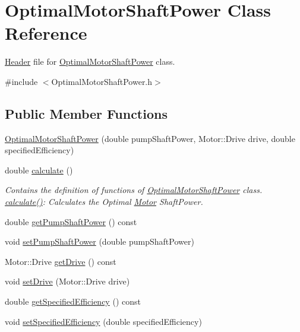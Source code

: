 \hypertarget{class_optimal_motor_shaft_power}{}\section{Optimal\+Motor\+Shaft\+Power Class Reference}
\label{class_optimal_motor_shaft_power}


\hyperlink{class_header}{Header} file for \hyperlink{class_optimal_motor_shaft_power}{Optimal\+Motor\+Shaft\+Power} class.  




{\ttfamily \#include $<$Optimal\+Motor\+Shaft\+Power.\+h$>$}

\subsection*{Public Member Functions}
\begin{DoxyCompactItemize}
\item 
\hyperlink{class_optimal_motor_shaft_power_ad830e1f8a7931e3c6bec5f8828d57e83}{Optimal\+Motor\+Shaft\+Power} (double pump\+Shaft\+Power, Motor\+::\+Drive drive, double specified\+Efficiency)
\item 
double \hyperlink{class_optimal_motor_shaft_power_a34d47733928ae518fa6f3d08b7d8a12e}{calculate} ()
\begin{DoxyCompactList}\small\item\em Contains the definition of functions of \hyperlink{class_optimal_motor_shaft_power}{Optimal\+Motor\+Shaft\+Power} class. \hyperlink{class_optimal_motor_shaft_power_a34d47733928ae518fa6f3d08b7d8a12e}{calculate()}\+: Calculates the Optimal \hyperlink{struct_motor}{Motor} Shaft\+Power. \end{DoxyCompactList}\item 
double \hyperlink{class_optimal_motor_shaft_power_aca7bb632c659ecf2ebf3cb9fdb23626f}{get\+Pump\+Shaft\+Power} () const
\item 
void \hyperlink{class_optimal_motor_shaft_power_ab2d80927fbaa62705359700b2a8f2f26}{set\+Pump\+Shaft\+Power} (double pump\+Shaft\+Power)
\item 
Motor\+::\+Drive \hyperlink{class_optimal_motor_shaft_power_a3cc369285d8b3582fcd8c44e5a1c37c8}{get\+Drive} () const
\item 
void \hyperlink{class_optimal_motor_shaft_power_a8f3288a69848c61f4e8e2b14da549d16}{set\+Drive} (Motor\+::\+Drive drive)
\item 
double \hyperlink{class_optimal_motor_shaft_power_a89c2038dae30ef58245e810187c2a6c4}{get\+Specified\+Efficiency} () const
\item 
void \hyperlink{class_optimal_motor_shaft_power_a92f7da022e380abbd8cfd308e8aa5e58}{set\+Specified\+Efficiency} (double specified\+Efficiency)
\end{DoxyCompactItemize}


